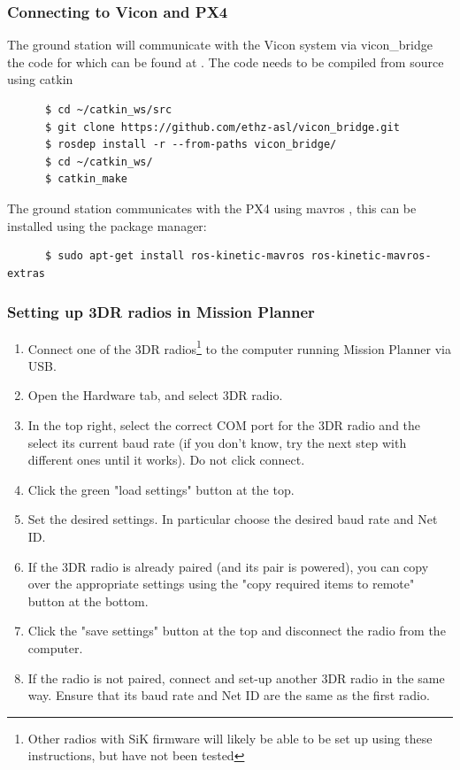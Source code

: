\documentclass[12pt,a4paper]{article}
\begin{document}
    \subsubsection{Connecting to Vicon and PX4} 
      \label{ssse: vicon mavros}
      The ground station will communicate with the Vicon system via vicon\_bridge \cite{vicon_bridge-ros} the code for which can be found at \cite{vicon_bridge-git}. The code needs to be compiled from source using catkin
      \begin{verbatim}
      $ cd ~/catkin_ws/src
      $ git clone https://github.com/ethz-asl/vicon_bridge.git
      $ rosdep install -r --from-paths vicon_bridge/
      $ cd ~/catkin_ws/
      $ catkin_make
      \end{verbatim}    
      The ground station communicates with the PX4 using mavros \cite{mavros}, this can be installed using the package manager:
       \begin{verbatim}
      $ sudo apt-get install ros-kinetic-mavros ros-kinetic-mavros-extras
      \end{verbatim}


    \subsubsection{Setting up 3DR radios in Mission Planner} 
    \label{sssec: 3dr mission planner}
      \begin{enumerate}
      \item Connect one of the 3DR radios\footnote{Other radios with SiK firmware will likely be able to be set up using these instructions, but have not been tested} to the computer running Mission Planner via USB. 
      \item Open the Hardware tab, and select 3DR radio.
      \item In the top right, select the correct COM port for the 3DR radio and the select its current baud rate (if you don't know, try the next step with different ones until it works). Do not click connect.
      \item Click the green "load settings" button at the top.
      \item Set the desired settings. In particular choose the desired baud rate and Net ID.
      \item If the 3DR radio is already paired (and its pair is powered), you can copy over the appropriate settings using the "copy required items to remote" button at the bottom.
      \item Click the "save settings" button at the top and disconnect the radio from the computer.
      \item If the radio is not paired, connect and set-up another 3DR radio in the same way. Ensure that its baud rate and Net ID are the same as the first radio.
      \end{enumerate}
\end{document}
